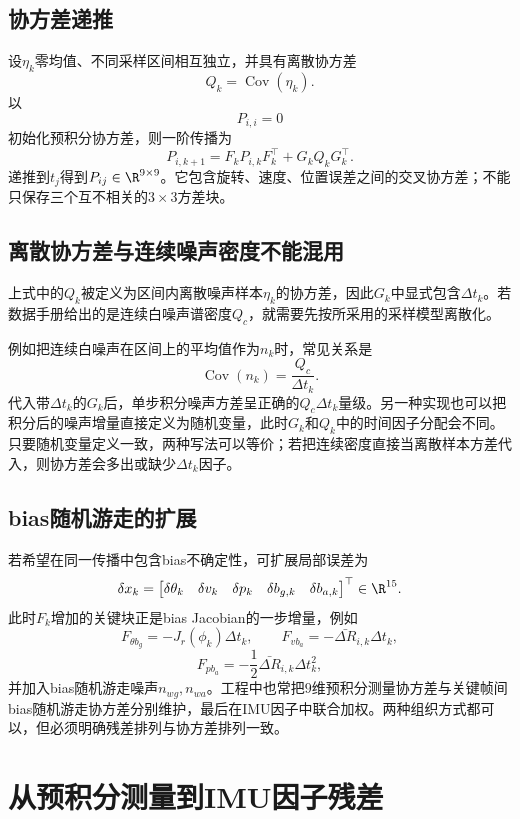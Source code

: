 \subsection{协方差递推}

设$\eta_k$零均值、不同采样区间相互独立，并具有离散协方差
\[
    Q_k=\operatorname{Cov}(\eta_k).
\]
以
\[
    P_{i,i}=0
\]
初始化预积分协方差，则一阶传播为
\[
\boxed{
    P_{i,k+1}
    =F_kP_{i,k}F_k^\top+G_kQ_kG_k^\top.
}
\]
递推到$t_j$得到$P_{ij}\in\R^{9\times9}$。它包含旋转、速度、位置误差之间的交叉协方差；不能只保存三个互不相关的$3\times3$方差块。

\subsection{离散协方差与连续噪声密度不能混用}

上式中的$Q_k$被定义为区间内离散噪声样本$\eta_k$的协方差，因此$G_k$中显式包含$\Delta t_k$。若数据手册给出的是连续白噪声谱密度$Q_c$，就需要先按所采用的采样模型离散化。

例如把连续白噪声在区间上的平均值作为$n_k$时，常见关系是
\[
    \operatorname{Cov}(n_k)=\frac{Q_c}{\Delta t_k}.
\]
代入带$\Delta t_k$的$G_k$后，单步积分噪声方差呈正确的$Q_c\Delta t_k$量级。另一种实现也可以把积分后的噪声增量直接定义为随机变量，此时$G_k$和$Q_k$中的时间因子分配会不同。只要随机变量定义一致，两种写法可以等价；若把连续密度直接当离散样本方差代入，则协方差会多出或缺少$\Delta t_k$因子。

\subsection{bias随机游走的扩展}

若希望在同一传播中包含bias不确定性，可扩展局部误差为
\[
    \delta x_k
    =\begin{bmatrix}
        \delta\theta_k&\delta v_k&\delta p_k&
        \delta b_{g,k}&\delta b_{a,k}
      \end{bmatrix}^\top\in\R^{15}.
\]
此时$F_k$增加的关键块正是bias Jacobian的一步增量，例如
\[
    F_{\theta b_g}=-J_r(\phi_k)\Delta t_k,
    \qquad
    F_{v b_a}=-\bar{\Delta R}_{i,k}\Delta t_k,
\]
\[
    F_{p b_a}=-\frac12\bar{\Delta R}_{i,k}\Delta t_k^2,
\]
并加入bias随机游走噪声$n_{wg},n_{wa}$。工程中也常把$9$维预积分测量协方差与关键帧间bias随机游走协方差分别维护，最后在IMU因子中联合加权。两种组织方式都可以，但必须明确残差排列与协方差排列一致。


\section{从预积分测量到IMU因子残差}

